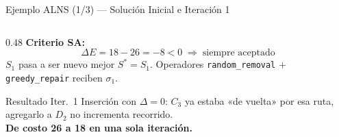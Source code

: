 \documentclass[aspectratio=169,10pt]{beamer}
\begin{document}
\begin{frame}{Ejemplo ALNS (1/3) --- Solución Inicial e Iteración 1}
\begin{columns}[T,onlytextwidth]
\begin{column}{0.48\textwidth}
      \vspace{0.2em}
      \textbf{Criterio SA:}
      \[ \Delta E = 18 - 26 = -8 < 0 \;\Rightarrow\; \text{siempre aceptado} \]
      \footnotesize $S_1$ pasa a ser nuevo mejor $S^* = S_1$.
      Operadores \texttt{random\_removal} + \texttt{greedy\_repair} reciben $\sigma_1$.

      \vspace{0.15em}
      \begin{alertblock}{Resultado Iter.\ 1}\small
        Inserción con $\Delta{=}0$: $C_3$ ya estaba «de vuelta» por esa ruta, agregarlo a $D_2$ no incrementa recorrido.\\
        \textbf{De costo 26 a 18 en una sola iteración.}
      \end{alertblock}
    \end{column}
  \end{columns}
\end{frame}
\end{document}
